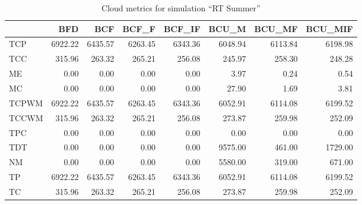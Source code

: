 \begin{table}[ht]
\centering
\begin{tabular}{lrrrrrrr}
\toprule
{} &       BFD &       BCF &     BCF\_F &    BCF\_IF &     BCU\_M &    BCU\_MF &   BCU\_MIF \\
\midrule
TCP   &  6922.22 &  6435.57 &  6263.45 &  6343.36 &  6048.94 &  6113.84 &  6198.98 \\
TCC   &   315.96 &   263.32 &   265.21 &   256.08 &   245.97 &   258.30 &   248.28 \\
ME    &     0.00 &     0.00 &     0.00 &     0.00 &     3.97 &     0.24 &     0.54 \\
MC    &     0.00 &     0.00 &     0.00 &     0.00 &    27.90 &     1.69 &     3.81 \\
TCPWM &  6922.22 &  6435.57 &  6263.45 &  6343.36 &  6052.91 &  6114.08 &  6199.52 \\
TCCWM &   315.96 &   263.32 &   265.21 &   256.08 &   273.87 &   259.98 &   252.09 \\
TPC   &     0.00 &     0.00 &     0.00 &     0.00 &     0.00 &     0.00 &     0.00 \\
TDT   &     0.00 &     0.00 &     0.00 &     0.00 &  9575.00 &   461.00 &  1729.00 \\
NM    &     0.00 &     0.00 &     0.00 &     0.00 &  5580.00 &   319.00 &   671.00 \\
TP    &  6922.22 &  6435.57 &  6263.45 &  6343.36 &  6052.91 &  6114.08 &  6199.52 \\
TC    &   315.96 &   263.32 &   265.21 &   256.08 &   273.87 &   259.98 &   252.09 \\
\bottomrule
\end{tabular}
\caption{Cloud metrics for simulation "`RT Summer"'}
\end{table}


